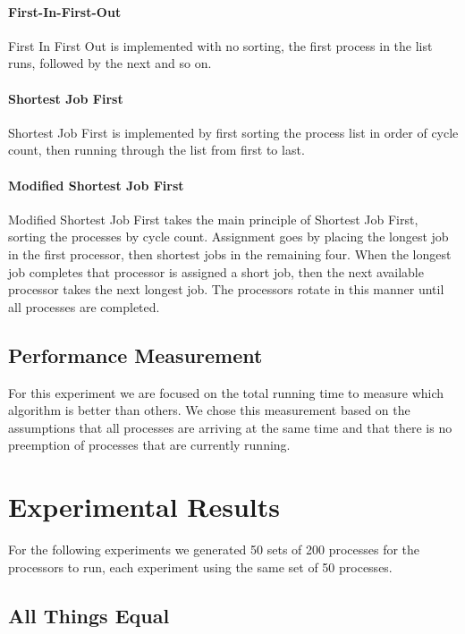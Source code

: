 \documentclass[12pt]{article}
\begin{document}
    \paragraph{First-In-First-Out}

    First In First Out is implemented with no sorting, the first process in the list runs, followed by the next and so on.

    \paragraph{Shortest Job First}

    Shortest Job First is implemented by first sorting the process list in order of cycle count, then running through the list from first to last.

    \paragraph{Modified Shortest Job First}

    Modified Shortest Job First takes the main principle of Shortest Job First, sorting the processes by cycle count. Assignment goes by placing the longest job in the first processor, then shortest jobs in the remaining four. When the longest job completes that processor is assigned a short job, then the next available processor takes the next longest job. The processors rotate in this manner until all processes are completed.

  \subsection{Performance Measurement}

  For this experiment we are focused on the total running time to measure which algorithm is better than others. We chose this measurement based on the assumptions that all processes are arriving at the same time and that there is no preemption of processes that are currently running.

\newpage
\section{Experimental Results}

For the following experiments we generated 50 sets of 200 processes for the processors to run, each experiment using the same set of 50 processes.

  \subsection{All Things Equal}
\end{document}
